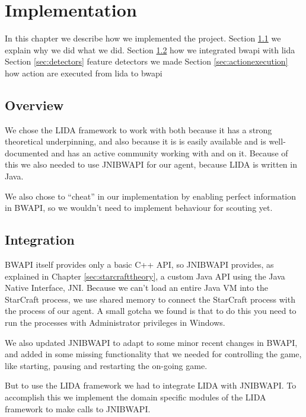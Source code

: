 
\chapter{Implementation}
In this chapter we describe how we implemented the project.
Section \ref{sec:overview} we explain why we did what we did.
Section \ref{sec:integration} how we integrated bwapi with lida
Section \ref{sec:detectors} feature detectors we made
Section \ref{sec:actionexecution} how action are executed from lida to bwapi

\section{Overview}
\label{sec:overview}
We chose the LIDA framework to work with both because it has a strong theoretical underpinning, and also because it is is easily available and is well-documented and has an active community working with and on it. Because of this we also needed to use JNIBWAPI for our agent, because LIDA is written in Java.

We also chose to ``cheat'' in our implementation by enabling perfect information in BWAPI, so we wouldn't need to implement behaviour for scouting yet.

\section{Integration}
\label{sec:integration}
BWAPI itself provides only a basic C++ API, so JNIBWAPI provides, as explained in Chapter \ref{sec:starcrafttheory}, a custom Java API using the Java Native Interface, JNI.\cite{jni} Because we can't load an entire Java VM into the StarCraft process, we use shared memory to connect the StarCraft process with the process of our agent. A small gotcha we found is that to do this you need to run the processes with Administrator privileges in Windows.

We also updated JNIBWAPI to adapt to some minor recent changes in BWAPI, and added in some missing functionality that we needed for controlling the game, like starting, pausing and restarting the on-going game.

But to use the LIDA framework we had to integrate LIDA with JNIBWAPI. To accomplish this we implement the domain specific modules of the LIDA framework to make calls to JNIBWAPI. 

